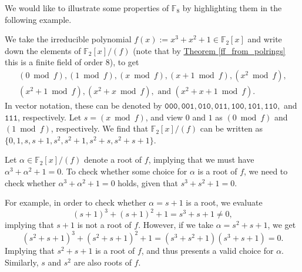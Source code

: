 \documentclass[openany, a4paper, 10pt]{book}
\theoremstyle{plain}
\theoremstyle{plain}
\theoremstyle{plain}
\theoremstyle{definition}
\theoremstyle{plain}
\theoremstyle{definition}
\theoremstyle{remark}
\newcommand{\theoref}[1]{\hyperref[#1]{Theorem \ref{#1}}}
\begin{document}
\begin{examplebox}
    We would like to illustrate some properties of $\mathbb F_8$ by highlighting them in the following example.
    \nocite{finite_fields_example}

    We take the irreducible polynomial $f(x):=x^3+x^2+1 \in \mathbb F_2[x]$ and write down the elements of $\mathbb F_2[x]/(f)$ (note that by \theoref{ff_from_polrings} this is a finite field of order 8), to get
    \begin{gather*}
        (0\bmod f), (1 \bmod f), (x\bmod f), (x+1\bmod f), (x^2\bmod f), \\
        (x^2+1\bmod f), (x^2+x\bmod f),\text{ and }(x^2+x+1\bmod f).
    \end{gather*}
    In vector notation, these can be denoted by $\texttt{000}, \texttt{001}, \texttt{010}, \texttt{011}, \texttt{100}, \texttt{101}, \texttt{110},$ and $\texttt{111}$, respectively.
    Let $s = (x\bmod f)$, and view $0$ and $1$ as $(0\bmod f)$ and $(1\bmod f)$, respectively.
    We find that $\mathbb F_2[x]/(f)$ can be written as $\{ 0, 1, s, s+1, s^2, s^2+1, s^2+s, s^2+s+1 \}$.

    Let $\alpha\in\mathbb F_2[x]/(f)$ denote a root of $f$, implying that we must have
    $\alpha^3 + \alpha^2 + 1 = 0$.
    To check whether some choice for $\alpha$ is a root of $f$, we need to check whether $\alpha^3 + \alpha^2 + 1 = 0$ holds, given that $s^3+s^2+1=0$.

    For example, in order to check whether $\alpha=s+1$ is a root, we evaluate
    $$(s+1)^3 + (s+1)^2 + 1 = s^3+s+1 \neq 0,$$
    implying that $s+1$ is not a root of $f$.
    However, if we take $\alpha = s^2+s+1$, we get
    $$(s^2+s+1)^3 + (s^2+s+1)^2 + 1 = (s^3+s^2+1)(s^3+s+1) = 0.$$
    Implying that $s^2+s+1$ is a root of $f$, and thus presents a valid choice for $\alpha$.
    Similarly, $s$ and $s^2$ are also roots of $f$.


\end{examplebox}
\end{document}
